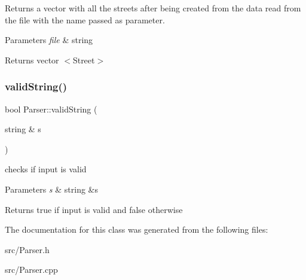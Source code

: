 Returns a vector with all the streets after being created from the data read from the file with the name passed as parameter. 


\begin{DoxyParams}{Parameters}
{\em file} & string \\
\hline
\end{DoxyParams}
\begin{DoxyReturn}{Returns}
vector $<$\+Street$>$ 
\end{DoxyReturn}
\mbox{\label{class_parser_ac49eaa953c8f063c8a3119b36df32c90}} 
\subsubsection{\texorpdfstring{valid\+String()}{validString()}}
{\footnotesize\ttfamily bool Parser\+::valid\+String (\begin{DoxyParamCaption}\item[{string \&}]{s }\end{DoxyParamCaption})}



checks if input is valid 


\begin{DoxyParams}{Parameters}
{\em s} & string \&s \\
\hline
\end{DoxyParams}
\begin{DoxyReturn}{Returns}
true if input is valid and false otherwise 
\end{DoxyReturn}


The documentation for this class was generated from the following files\+:\begin{DoxyCompactItemize}
\item 
src/Parser.\+h\item 
src/Parser.\+cpp\end{DoxyCompactItemize}
